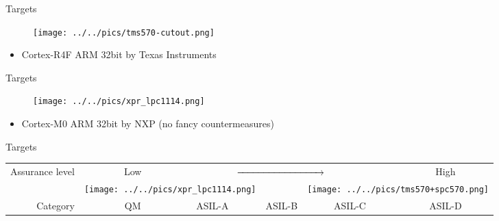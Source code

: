 \documentclass[table]{beamer}
\begin{document}
\begin{frame}[t]{Targets}
    \begin{figure}[H]
      \centering
      \texttt{[image: ../../pics/tms570-cutout.png]}
    \end{figure}

    \begin{itemize}
        \item Cortex-R4F ARM 32bit by Texas Instruments
    \end{itemize}
\end{frame}

\begin{frame}[t]{Targets}
    \begin{figure}[H]
      \centering
      \texttt{[image: ../../pics/xpr\_lpc1114.png]}
    \end{figure}

    \begin{itemize}
        \item Cortex-M0 ARM 32bit by NXP (no fancy countermeasures)
    \end{itemize}
\end{frame}

\begin{frame}{Targets}

      \begin{table}[H]
            \centering
        \begin{tabular}{rcccccc}
        Assurance level && Low &  \multicolumn{3}{c}{$\xrightarrow{\hspace*{3cm}}$}      & High \\
                         &\multicolumn{3}{l}{\texttt{[image: ../../pics/xpr\_lpc1114.png]}} &&\multicolumn{2}{r}{\texttt{[image: ../../pics/tms570+spc570.png]}} \\
        Category        && QM  & ASIL-A & ASIL-B & ASIL-C & ASIL-D \\
        \end{tabular}
      \end{table}

\end{frame}
\end{document}

